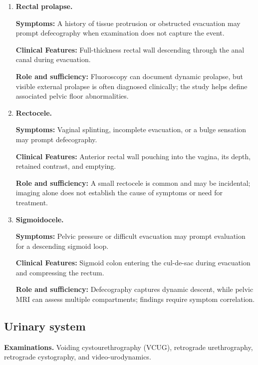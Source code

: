 \begin{enumerate}[leftmargin=*,itemsep=0.45em,topsep=0.4em]
\item \textbf{Rectal prolapse.}\par\noindent\textbf{Symptoms:} A history of tissue protrusion or obstructed evacuation may prompt defecography when examination does not capture the event.\par\noindent\textbf{Clinical Features:} Full-thickness rectal wall descending through the anal canal during evacuation.\par\noindent\textbf{Role and sufficiency:} Fluoroscopy can document dynamic prolapse, but visible external prolapse is often diagnosed clinically; the study helps define associated pelvic floor abnormalities.
\item \textbf{Rectocele.}\par\noindent\textbf{Symptoms:} Vaginal splinting, incomplete evacuation, or a bulge sensation may prompt defecography.\par\noindent\textbf{Clinical Features:} Anterior rectal wall pouching into the vagina, its depth, retained contrast, and emptying.\par\noindent\textbf{Role and sufficiency:} A small rectocele is common and may be incidental; imaging alone does not establish the cause of symptoms or need for treatment.
\item \textbf{Sigmoidocele.}\par\noindent\textbf{Symptoms:} Pelvic pressure or difficult evacuation may prompt evaluation for a descending sigmoid loop.\par\noindent\textbf{Clinical Features:} Sigmoid colon entering the cul-de-sac during evacuation and compressing the rectum.\par\noindent\textbf{Role and sufficiency:} Defecography captures dynamic descent, while pelvic MRI can assess multiple compartments; findings require symptom correlation.
\end{enumerate}

\subsection{Urinary system}
\textbf{Examinations.} Voiding cystourethrography (VCUG), retrograde urethrography, retrograde cystography, and video-urodynamics.

